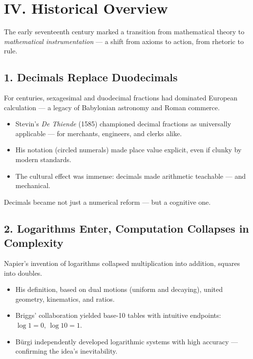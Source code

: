 \documentclass[9pt]{article}
\begin{document}
\newpage


\section*{IV. Historical Overview}

The early seventeenth century marked a transition from mathematical theory to \textit{mathematical instrumentation} — a shift from axioms to action, from rhetoric to rule.

\subsection*{1. Decimals Replace Duodecimals}

For centuries, sexagesimal and duodecimal fractions had dominated European calculation — a legacy of Babylonian astronomy and Roman commerce.

\begin{itemize}
    \item Stevin’s \textit{De Thiende} (1585) championed decimal fractions as universally applicable — for merchants, engineers, and clerks alike.
    \item His notation (circled numerals) made place value explicit, even if clunky by modern standards.
    \item The cultural effect was immense: decimals made arithmetic teachable — and mechanical.
\end{itemize}

Decimals became not just a numerical reform — but a cognitive one.

\subsection*{2. Logarithms Enter, Computation Collapses in Complexity}

Napier’s invention of logarithms collapsed multiplication into addition, squares into doubles.

\begin{itemize}
    \item His definition, based on dual motions (uniform and decaying), united geometry, kinematics, and ratios.
    \item Briggs’ collaboration yielded base-10 tables with intuitive endpoints: $\log 1 = 0$, $\log 10 = 1$.
    \item Bürgi independently developed logarithmic systems with high accuracy — confirming the idea’s inevitability.
\end{itemize}
\end{document}

